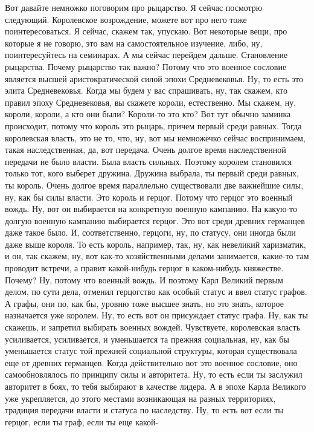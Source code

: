Вот давайте немножко поговорим про рыцарство. Я сейчас посмотрю
следующий. Королевское возрождение, можете вот про него тоже поинтересоваться. Я
сейчас, скажем так, упускаю. Вот некоторые вещи, про которые я не говорю, это
вам на самостоятельное изучение, либо, ну, поинтересуйтесь на семинарах. А мы
сейчас перейдем дальше. Становление рыцарства. Почему рыцарство так важно?
Потому что это военное сословие является высшей аристократической силой эпохи
Средневековья. Ну, то есть это элита Средневековья. Когда мы будем у вас
спрашивать, ну, так скажем, кто правил эпоху Средневековья, вы скажете короли,
естественно. Мы скажем, ну, короли, короли, а кто они были? Короли-то это кто?
Вот тут обычно заминка происходит, потому что король это рыцарь, причем первый
среди равных. Тогда королевская власть, это не то, что, ну, вот мы немножечко
сейчас воспринимаем, такая наследственная, да, вот передача. Очень долгое время
наследственной передачи не было власти. Была власть сильных. Поэтому королем
становился только тот, кого выберет дружина. Дружина выбрала, ты первый среди
равных, ты король. Очень долгое время параллельно существовали две важнейшие
силы, ну, как бы силы власти. Это король и герцог. Потому что герцог это военный
вождь. Ну, вот он выбирается на конкретную военную кампанию. На какую-то долгую
военную кампанию выбирается герцог. Это вот среди древних германцев даже такое
было. И, соответственно, герцоги, ну, по статусу, они иногда были даже выше
короля. То есть король, например, так, ну, как невеликий харизматик, и он, так
скажем, ну, вот как-то хозяйственными делами занимается, какие-то там проводит
встречи, а правит какой-нибудь герцог в каком-нибудь княжестве. Почему? Ну,
потому что военный вождь. И поэтому Карл Великий первым делом, по сути дела,
отменил герцогство как особый статус и ввел статус графов. А графы, они по, как
бы, уровню тоже высшее знать, но это знать, которое назначается уже королем. Ну,
то есть вот он присуждает статус графа. Ну, как ты скажешь, и запретил выбирать
военных вождей. Чувствуете, королевская власть усиливается, усиливается, и
уменьшается та прежняя социальная, ну, как бы уменьшается статус той прежней
социальной структуры, которая существовала еще от древних германцев. Когда
действительно вот это военное сословие, оно самообновлялось по принципу силы и
авторитета. Ну, то есть если ты заслужил авторитет в боях, то тебя выбирают в
качестве лидера. А в эпохе Карла Великого уже укрепляется, до этого местами
возникающая на разных территориях, традиция передачи власти и статуса по
наследству. Ну, то есть вот если ты герцог, если ты граф, если ты еще какой-
